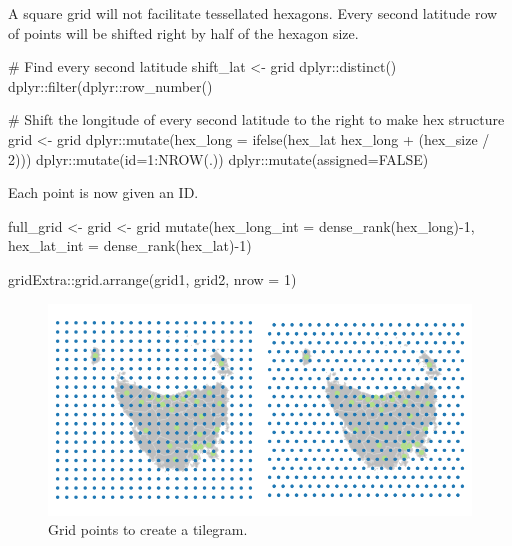 A square grid will not facilitate tessellated hexagons. Every second
latitude row of points will be shifted right by half of the hexagon
size.

\begin{Schunk}
\begin{Sinput}
# Find every second latitude
shift_lat <- grid %
    dplyr::distinct() %
    dplyr::filter(dplyr::row_number() %

# Shift the longitude of every second latitude to the right to make hex structure
grid <- grid %
    dplyr::mutate(hex_long = ifelse(hex_lat %
        hex_long + (hex_size / 2))) %
    dplyr::mutate(id=1:NROW(.)) %
    dplyr::mutate(assigned=FALSE)
\end{Sinput}
\end{Schunk}

\begin{Schunk}
\end{Schunk}

Each point is now given an ID.

\begin{Schunk}
\begin{Sinput}
full_grid <- grid <- grid %
    mutate(hex_long_int = dense_rank(hex_long)-1,
        hex_lat_int = dense_rank(hex_lat)-1)
\end{Sinput}
\end{Schunk}

\begin{Schunk}
\begin{Sinput}
gridExtra::grid.arrange(grid1, grid2, nrow = 1)
\end{Sinput}
\begin{figure}
\includegraphics{algorithmRjournal_files/figure-latex/unnamed-chunk-2-1} \caption[Grid points to create a tilegram]{Grid points to create a tilegram.}\label{fig:unnamed-chunk-2}
\end{figure}
\end{Schunk}


